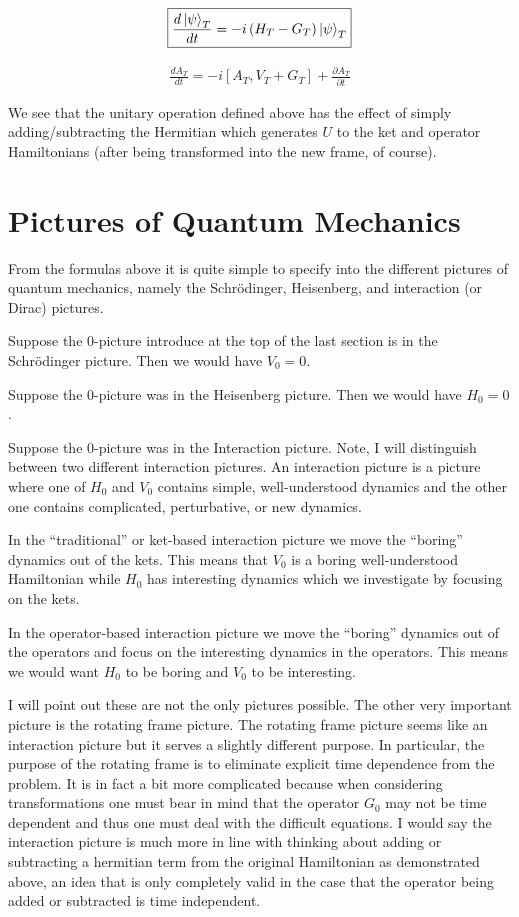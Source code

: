 \documentclass[12pt]{article}
\newcommand{\ddt}[1]{\frac{d #1}{dt}}
\begin{document}
\begin{align}
\boxed{\ddt{\ket{\psi}_T} = -i \left(H_T - G_T \right) \ket{\psi}_T}
\end{align}

\begin{align}
\boxed{
	\ddt{A_T} = -i\left[A_T, V_T + G_T \right] + \frac{\partial A_T}{\partial t}
}
\end{align}

We see that the unitary operation defined above has the effect of simply adding/subtracting the Hermitian which generates $U$ to the ket and operator Hamiltonians (after being transformed into the new frame, of course).

\section{Pictures of Quantum Mechanics}

From the formulas above it is quite simple to specify into the different pictures of quantum mechanics, namely the Schr{\"o}dinger, Heisenberg, and interaction (or Dirac) pictures.

Suppose the $0$-picture introduce at the top of the last section is in the Schr{\"o}dinger picture. Then we would have $V_0=0$. 

Suppose the $0$-picture was in the Heisenberg picture. Then we would have $H_0=0$.

Suppose the $0$-picture was in the Interaction picture. Note, I will distinguish between two different interaction pictures. An interaction picture is a picture where one of $H_0$ and $V_0$ contains simple, well-understood dynamics and the other one contains complicated, perturbative, or new dynamics. 

In the ``traditional'' or ket-based interaction picture we move the ``boring'' dynamics out of the kets. This means that $V_0$ is a boring well-understood Hamiltonian while $H_0$ has interesting dynamics which we investigate by focusing on the kets.

In the operator-based interaction picture we move the ``boring'' dynamics out of the operators and focus on the interesting dynamics in the operators. This means we would want $H_0$ to be boring and $V_0$ to be interesting.

I will point out these are not the only pictures possible. The other very important picture is the rotating frame picture. The rotating frame picture seems like an interaction picture but it serves a slightly different purpose. In particular, the purpose of the rotating frame is to eliminate explicit time dependence from the problem. It is in fact a bit more complicated because when considering transformations one must bear in mind that the operator $G_0$ may not be time dependent and thus one must deal with the difficult equations. I would say the interaction picture is much more in line with thinking about adding or subtracting a hermitian term from the original Hamiltonian as demonstrated above, an idea that is only completely valid in the case that the operator being added or subtracted is time independent.
\end{document}

